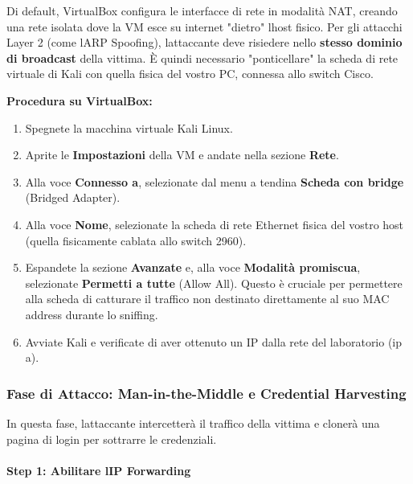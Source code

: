 \documentclass[11pt,a4paper]{article}
\begin{document}
Di default, VirtualBox configura le interfacce di rete in modalità NAT,
creando una rete isolata dove la VM esce su internet "dietro"
l\textquotesingle host fisico. Per gli attacchi Layer 2 (come
l\textquotesingle ARP Spoofing), l\textquotesingle attaccante deve
risiedere nello \textbf{stesso dominio di broadcast} della vittima. È
quindi necessario "ponticellare" la scheda di rete virtuale di Kali con
quella fisica del vostro PC, connessa allo switch Cisco.

\textbf{Procedura su VirtualBox:}

\begin{enumerate}
\def\labelenumi{\arabic{enumi}.}
\item
  Spegnete la macchina virtuale Kali Linux.
\item
  Aprite le \textbf{Impostazioni} della VM e andate nella sezione
  \textbf{Rete}.
\item
  Alla voce \textbf{Connesso a}, selezionate dal menu a tendina
  \textbf{Scheda con bridge} (Bridged Adapter).
\item
  Alla voce \textbf{Nome}, selezionate la scheda di rete Ethernet fisica
  del vostro host (quella fisicamente cablata allo switch 2960).
\item
  Espandete la sezione \textbf{Avanzate} e, alla voce \textbf{Modalità
  promiscua}, selezionate \textbf{Permetti a tutte} (Allow All). Questo
  è cruciale per permettere alla scheda di catturare il traffico non
  destinato direttamente al suo MAC address durante lo sniffing.
\item
  Avviate Kali e verificate di aver ottenuto un IP dalla rete del
  laboratorio (ip a).
\end{enumerate}

\subsubsection{Fase di Attacco: Man-in-the-Middle e Credential
Harvesting}\label{fase-di-attacco-man-in-the-middle-e-credential-harvesting}

In questa fase, l\textquotesingle attaccante intercetterà il traffico
della vittima e clonerà una pagina di login per sottrarre le
credenziali.

\paragraph{Step 1: Abilitare l\textquotesingle IP
Forwarding}\label{step-1-abilitare-lip-forwarding}
\end{document}
